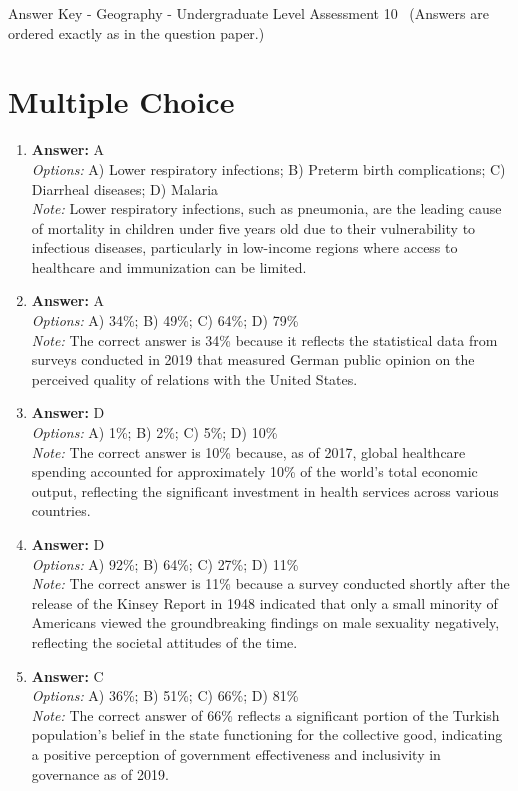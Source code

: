 \documentclass[12pt]{article}
\begin{document}
\begin{center}
Answer Key - Geography - Undergraduate Level Assessment 10 \
\small (Answers are ordered exactly as in the question paper.)
\end{center}

\section*{Multiple Choice}
\begin{enumerate}[label=\arabic*.]
\item \textbf{Answer:} A
\\ \textit{Options:} A) Lower respiratory infections; B) Preterm birth complications; C) Diarrheal diseases; D) Malaria
\\ \textit{Note:} Lower respiratory infections, such as pneumonia, are the leading cause of mortality in children under five years old due to their vulnerability to infectious diseases, particularly in low-income regions where access to healthcare and immunization can be limited.
\item \textbf{Answer:} A
\\ \textit{Options:} A) 34\%; B) 49\%; C) 64\%; D) 79\%
\\ \textit{Note:} The correct answer is 34\% because it reflects the statistical data from surveys conducted in 2019 that measured German public opinion on the perceived quality of relations with the United States.
\item \textbf{Answer:} D
\\ \textit{Options:} A) 1\%; B) 2\%; C) 5\%; D) 10\%
\\ \textit{Note:} The correct answer is 10\% because, as of 2017, global healthcare spending accounted for approximately 10\% of the world's total economic output, reflecting the significant investment in health services across various countries.
\item \textbf{Answer:} D
\\ \textit{Options:} A) 92\%; B) 64\%; C) 27\%; D) 11\%
\\ \textit{Note:} The correct answer is 11\% because a survey conducted shortly after the release of the Kinsey Report in 1948 indicated that only a small minority of Americans viewed the groundbreaking findings on male sexuality negatively, reflecting the societal attitudes of the time.
\item \textbf{Answer:} C
\\ \textit{Options:} A) 36\%; B) 51\%; C) 66\%; D) 81\%
\\ \textit{Note:} The correct answer of 66\% reflects a significant portion of the Turkish population's belief in the state functioning for the collective good, indicating a positive perception of government effectiveness and inclusivity in governance as of 2019.
\end{enumerate}
\end{document}
